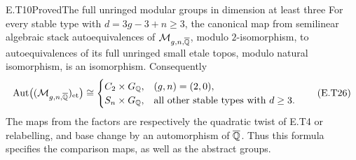 \begin{result}{E.T10}{Proved}{The full unringed modular groups in dimension at least three}
For every stable type with $d=3g-3+n\geq3$, the canonical
map from semilinear algebraic stack autoequivalences of
$\mathcal M_{g,n,\overline{\mathbb Q}}$, modulo $2$-isomorphism, to
autoequivalences of its full unringed small etale topos,
modulo natural isomorphism, is an isomorphism.  Consequently
\[
 \operatorname{Aut}\bigl((\mathcal M_{g,n,\overline{\mathbb Q}})_{\mathrm{et}}\bigr)
 \cong
 \begin{cases}
 C_2\times G_{\mathbb Q},&(g,n)=(2,0),\\
 S_n\times G_{\mathbb Q},&\text{all other stable types with }d\geq3.
 \end{cases}                                                   \tag{E.T26}
\]
The maps from the factors are respectively the quadratic
twist of E.T4 or relabelling, and base change by an
automorphism of $\overline{\mathbb Q}$.  Thus this formula specifies
the comparison maps, as well as the abstract groups.
\end{result}

